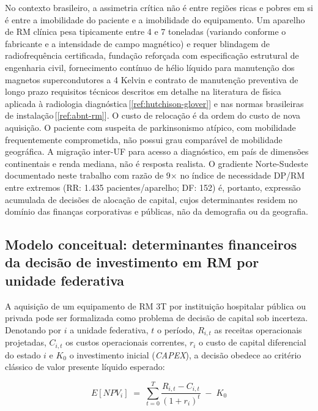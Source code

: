 \documentclass[12pt,a4paper,oneside]{article}
\begin{document}
No contexto brasileiro, a assimetria crítica não é entre regiões
ricas e pobres em si \textemdash{} é entre a imobilidade do
paciente e a imobilidade do equipamento. Um aparelho de RM clínica
pesa tipicamente entre 4 e 7 toneladas (variando conforme o
fabricante e a intensidade de campo magnético) e requer blindagem
de radiofrequência certificada, fundação reforçada com
especificação estrutural de engenharia civil, fornecimento
contínuo de hélio líquido para manutenção dos magnetos
supercondutores a 4 Kelvin e contrato de manutenção preventiva
de longo prazo \textemdash{} requisitos técnicos descritos em
detalhe na literatura de física aplicada à radiologia
diagnóstica\,[\ref{ref:hutchison-glover}] e nas normas
brasileiras de instalação\,[\ref{ref:abnt-rm}]. O custo de
relocação é da ordem do custo de nova aquisição. O
paciente com suspeita de parkinsonismo atípico, com mobilidade
frequentemente comprometida, não possui grau comparável de
mobilidade geográfica. A migração inter-UF para acesso a
diagnóstico, em país de dimensões continentais e renda mediana,
não é resposta realista. O gradiente Norte-Sudeste documentado
neste trabalho \textemdash{} com razão de 9$\times$ no índice de
necessidade DP/RM entre extremos (RR: 1.435 pacientes/aparelho;
DF: 152) \textemdash{} é, portanto, expressão acumulada de
decisões de alocação de capital, cujos determinantes residem no
domínio das finanças corporativas e públicas, não da demografia
ou da geografia.

\subsection{Modelo conceitual: determinantes financeiros da decisão
de investimento em RM por unidade
federativa}\label{subsec:modelo-financeiro}

A aquisição de um equipamento de RM 3T por instituição hospitalar
pública ou privada pode ser formalizada como problema de decisão
de capital sob incerteza. Denotando por $i$ a unidade federativa,
$t$ o período, $R_{i,t}$ as receitas operacionais projetadas,
$C_{i,t}$ os custos operacionais correntes, $r_i$ o custo de
capital diferencial do estado $i$ e $K_0$ o investimento inicial
(\textit{CAPEX}), a decisão obedece ao critério clássico de valor
presente líquido esperado:

\begin{equation}
E[\mathit{NPV}_i] \;=\; \sum_{t=0}^{T}
\frac{R_{i,t} - C_{i,t}}{(1 + r_i)^t} \;-\; K_0
\label{eq:npv}
\end{equation}
\end{document}
